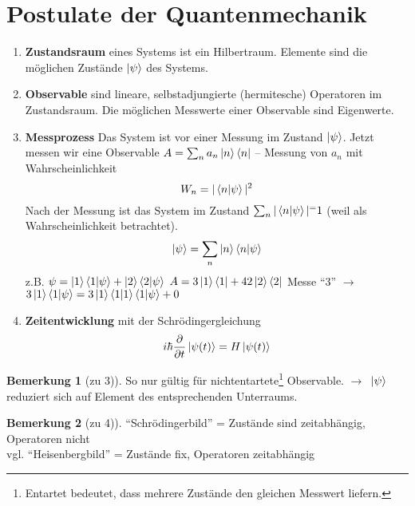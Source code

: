 \documentclass[oneside]{book}
\theoremstyle{definition}
\newtheorem*{bemerkung*}{Bemerkung}
\newcommand{\conseq}{$\rightarrow$~}
\newcommand{\fpartial}[1]{\frac{\partial}{\partial #1}}
\begin{document}
\section{Postulate der Quantenmechanik}
\begin{enumerate}[1)]
\item \textbf{Zustandsraum} eines Systems ist ein Hilbertraum. Elemente sind die möglichen Zustände $\ket{\psi}$ des Systems.
\item \textbf{Observable} sind lineare, selbstadjungierte (hermitesche) Operatoren im Zustandsraum. Die möglichen Messwerte einer Observable sind Eigenwerte.
\item \textbf{Messprozess} Das System ist vor einer Messung im Zustand $\ket{\psi}$. Jetzt messen wir eine Observable $A = \sum_n a_n \ket{n} \bra{n}$ – Messung von $a_n$ mit Wahrscheinlichkeit
$$W_n = |\braket{n | \psi}|^2$$
Nach der Messung ist das System im Zustand $\sum_n | \braket{n | \psi}|^ = 1$ (weil als Wahrscheinlichkeit betrachtet).
$$\ket{\psi} = \sum_n \ket{n}\braket{n | \psi}$$
z.B. $\psi = \ket{1}\braket{1 | \psi} + \ket{2}\braket{2 | \psi}$
$A = 3 \ket{1}\bra{1} + 42 \ket{2}\bra{2}$ Messe "`3"' \conseq $3 \ket{1}\braket{1 | \psi} = 3 \ket{1}\braket{1 | 1} \braket{1 | \psi} + 0$
\item \textbf{Zeitentwicklung} mit der Schrödingergleichung
$$ i\hbar \fpartial{t} \ket{\psi(t)} = H \ket{\psi(t)}$$
\end{enumerate}

\begin{bemerkung*}[zu 3)]
	So nur gültig für nichtentartete\footnote{Entartet bedeutet, dass mehrere Zustände den gleichen Messwert liefern.} Observable. \conseq $\ket{\psi}$ reduziert sich auf Element des entsprechenden Unterraums.
\end{bemerkung*}

\begin{bemerkung*}[zu 4)]
	"`Schrödingerbild"' = Zustände sind zeitabhängig, Operatoren nicht\\
	vgl. "`Heisenbergbild"' = Zustände fix, Operatoren zeitabhängig
\end{bemerkung*}
\end{document}
